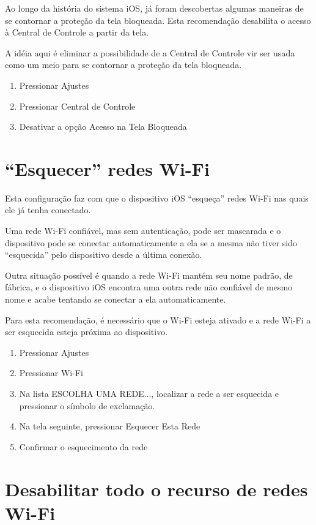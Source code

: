 Ao longo da hist\'oria do sistema iOS, j\'a foram descobertas algumas maneiras de se contornar a prote\c c\~ao da tela bloqueada. Esta recomenda\c c\~ao desabilita o acesso \`a Central de Controle a partir da tela. 

A id\'eia aqui \'e eliminar a possibilidade de a Central de Controle vir ser usada como um  meio para se contornar a prote\c c\~ao da tela bloqueada.

\begin{enumerate}
\item Pressionar Ajustes
\item Pressionar Central de Controle
\item Desativar a op\c c\~ao Acesso na Tela Bloqueada
\end{enumerate}

\section{``Esquecer'' redes Wi-Fi}

Esta configura\c c\~ao faz com que o dispositivo iOS ``esque\c ca'' redes Wi-Fi nas quais ele j\'a tenha conectado. 

Uma rede Wi-Fi confi\'avel, mas sem autentica\c c\~ao, pode ser mascarada e o dispositivo pode se conectar automaticamente a ela se a mesma n\~ao tiver sido ``esquecida'' pelo dispositivo desde a \'ultima conex\~ao.

Outra situa\c c\~ao poss\'ivel \'e quando a rede Wi-Fi mant\'em seu nome padr\~ao, de f\'abrica, e o dispositivo iOS encontra uma outra rede n\~ao confi\'avel de mesmo nome e acabe tentando se conectar a ela automaticamente.

Para esta recomenda\c c\~ao, \'e necess\'ario que o Wi-Fi esteja ativado e a rede Wi-Fi a ser esquecida esteja pr\'oxima ao dispositivo. 

\begin{enumerate}
\item Pressionar Ajustes
\item Pressionar Wi-Fi
\item Na lista ESCOLHA UMA REDE..., localizar a rede a ser esquecida e pressionar o s\'imbolo de exclama\c c\~ao.
\item Na tela seguinte, pressionar Esquecer Esta Rede
\item Confirmar o esquecimento da rede
\end{enumerate}

\section{Desabilitar todo o recurso de redes Wi-Fi}

